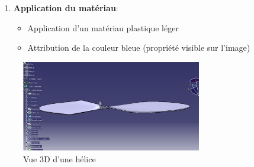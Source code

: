 \documentclass[a4paper,12pt]{report}
\begin{document}
\begin{enumerate}
    \item \textbf{Application du matériau}:
    \begin{itemize}
        \item Application d'un matériau plastique léger
        \item Attribution de la couleur bleue (propriété visible sur l'image)
    \end{itemize}
\end{enumerate}

\begin{figure}[H]
    \centering
    \includegraphics[width=0.7\textwidth]{images/helice_drone.png}
    \caption{Vue 3D d'une hélice}
    \label{fig:helice}
\end{figure}
\end{document}
